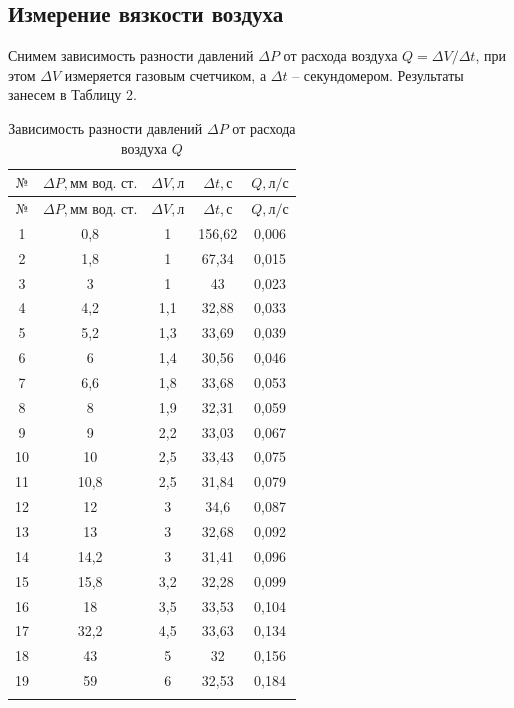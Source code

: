 \documentclass[a4paper,12pt]{article}
\theoremstyle{plain} %
\theoremstyle{definition} %
\theoremstyle{remark} %
\begin{document}
\subsection{Измерение вязкости воздуха}
Снимем зависимость разности давлений $\Delta P$ от расхода воздуха $Q = \Delta V/ \Delta t$, при этом $\Delta V$ измеряется газовым счетчиком, а $\Delta t$ -- секундомером. Результаты занесем в Таблицу 2.
\begin{longtable}{|c|c|c|c|c|}
	\hline
$\text{№}$ &  $\Delta P, \text{мм вод. ст.}$  & $\Delta V, \text{л}$ & $\Delta t, \text{с}$ & $Q, \text{л/с}$        \\ \hline
	\endfirsthead
	\hline
	$\text{№}$ &  $\Delta P, \text{мм вод. ст.}$  & $\Delta V, \text{л}$ & $\Delta t, \text{с}$    &  $Q, \text{л/с}$     \\ \hline
	\endhead
	\hline
	\endfoot

	\endlastfoot

1  & 0,8  & 1   & 156,62 & 0,006 \\ \hline
2  & 1,8  & 1   & 67,34  & 0,015 \\ \hline
3  & 3    & 1   & 43     & 0,023 \\ \hline
4  & 4,2  & 1,1 & 32,88  & 0,033 \\ \hline
5  & 5,2  & 1,3 & 33,69  & 0,039 \\ \hline
6  & 6    & 1,4 & 30,56  & 0,046 \\ \hline
7  & 6,6  & 1,8 & 33,68  & 0,053 \\ \hline
8  & 8    & 1,9 & 32,31  & 0,059 \\ \hline
9  & 9    & 2,2 & 33,03  & 0,067 \\ \hline
10 & 10   & 2,5 & 33,43  & 0,075 \\ \hline
11 & 10,8 & 2,5 & 31,84  & 0,079 \\ \hline
12 & 12   & 3   & 34,6   & 0,087 \\ \hline
13 & 13   & 3   & 32,68  & 0,092 \\ \hline
14 & 14,2 & 3   & 31,41  & 0,096 \\ \hline
15 & 15,8 & 3,2 & 32,28  & 0,099 \\ \hline
16 & 18   & 3,5 & 33,53  & 0,104 \\ \hline
17 & 32,2 & 4,5 & 33,63  & 0,134 \\ \hline
18 & 43   & 5   & 32     & 0,156 \\ \hline
19 & 59   & 6   & 32,53  & 0,184 \\ \hline

\caption {Зависимость разности давлений $\Delta P$ от расхода воздуха $Q$}
\end{longtable}
\end{document}
